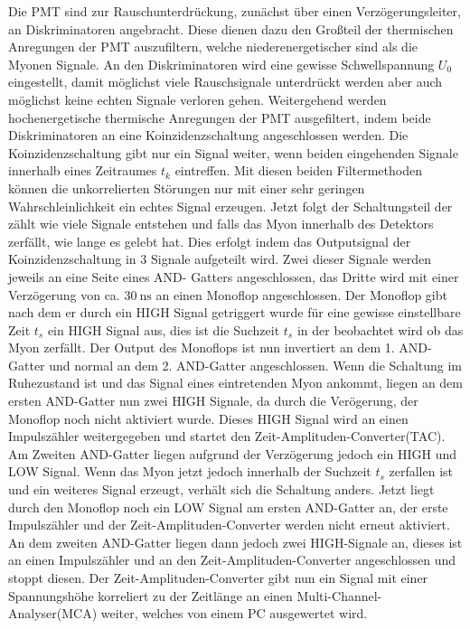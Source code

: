     Die PMT sind zur Rauschunterdrückung, zunächst über einen Verzögerungsleiter, an Diskriminatoren angebracht.
    Diese dienen dazu den Großteil der thermischen Anregungen der PMT auszufiltern, welche niederenergetischer sind als die Myonen Signale.
    An den Diskriminatoren wird eine gewisse Schwellspannung $U_0$ eingestellt, damit möglichst viele Rauschsignale unterdrückt werden aber auch möglichst keine echten Signale verloren gehen.
    Weitergehend werden hochenergetische thermische Anregungen der PMT ausgefiltert, indem beide Diskriminatoren an eine Koinzidenzschaltung angeschlossen werden.
    Die Koinzidenzschaltung gibt nur ein Signal weiter, wenn beiden eingehenden Signale innerhalb eines Zeitraumes $t_k$ eintreffen. 
    Mit diesen beiden Filtermethoden können die unkorrelierten Störungen nur mit einer sehr geringen Wahrschleinlichkeit ein echtes Signal erzeugen.
    Jetzt folgt der Schaltungsteil der zählt wie viele Signale entstehen und falls das Myon innerhalb des Detektors zerfällt, wie lange es gelebt hat.
    Dies erfolgt indem das Outputsignal der Koinzidenzschaltung in 3 Signale aufgeteilt wird.
    Zwei dieser Signale werden jeweils an eine Seite eines AND- Gatters angeschlossen, das Dritte wird mit einer Verzögerung von ca. $\SI{30}{\nano\second}$ an einen Monoflop angeschlossen.
    Der Monoflop gibt nach dem er durch ein HIGH Signal getriggert wurde für eine gewisse einstellbare Zeit $t_s$ ein HIGH Signal aus, dies ist die Suchzeit $t_s$ in der beobachtet wird ob das Myon zerfällt.
    Der Output des Monoflops ist nun invertiert an dem 1. AND-Gatter und normal an dem 2. AND-Gatter angeschlossen.
    Wenn die Schaltung im Ruhezustand ist und das Signal eines eintretenden Myon ankommt, liegen an dem ersten AND-Gatter nun zwei HIGH Signale, da durch die Verögerung, der Monoflop noch nicht aktiviert wurde.
    Dieses HIGH Signal wird an einen Impulszähler weitergegeben und startet den Zeit-Amplituden-Converter(TAC).
    Am Zweiten AND-Gatter liegen aufgrund der Verzögerung jedoch ein HIGH und LOW Signal.
    Wenn das Myon jetzt jedoch innerhalb der Suchzeit $t_s$ zerfallen ist und ein weiteres Signal erzeugt, verhält sich die Schaltung anders.
    Jetzt liegt durch den Monoflop noch ein LOW Signal am ersten AND-Gatter an, der erste Impulszähler und der Zeit-Amplituden-Converter werden nicht erneut aktiviert.
    An dem zweiten AND-Gatter liegen dann jedoch zwei HIGH-Signale an, dieses ist an einen Impulszähler und an den Zeit-Amplituden-Converter angeschlossen und stoppt diesen.
    Der Zeit-Amplituden-Converter gibt nun ein Signal mit einer Spannungshöhe korreliert zu der Zeitlänge an einen Multi-Channel-Analyser(MCA) weiter, welches von einem PC ausgewertet wird.

